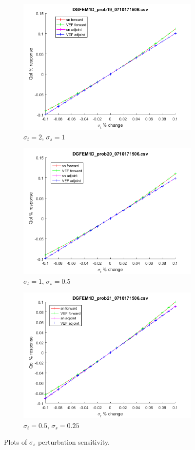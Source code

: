 \documentclass{article}
\newcommand{\sigt}{\sigma_t}
\newcommand{\sigs}{\sigma_s}
\begin{document}
\begin{figure}[H]
\label{HomoPerts}
\centering
\begin{subfigure}{.5\textwidth}
  \centering
  \includegraphics[width=.8\linewidth]{figures/19sigsSens.png}
  \caption{$\sigt=2$, $\sigs=1$}
  \label{fig:sfig1}
\end{subfigure}%
\begin{subfigure}{.5\textwidth}
  \centering
  \includegraphics[width=.8\linewidth]{figures/20sigsSens.png}
  \caption{$\sigt=1$, $\sigs=0.5$}
  \label{fig:sfig2}
\end{subfigure}
\begin{subfigure}{.5\textwidth}
  \centering
  \includegraphics[width=.8\linewidth]{figures/21sigsSens.png}
  \caption{$\sigt=0.5$, $\sigs=0.25$}
  \label{fig:sfig3}
\end{subfigure}
\caption{Plots of $\sigs$ perturbation sensitivity.}
\label{fig:fig}
\end{figure}
\end{document}
